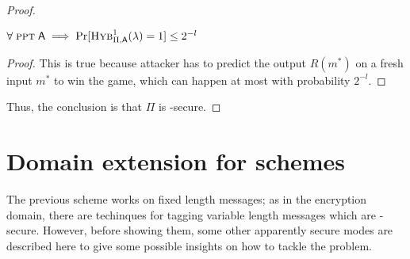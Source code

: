 \begin{proof}
\begin{cryptoredux}
        \cseqbeginloop
        \cseqendloop

        \cseqdelay
    

        \cseqdelay

        
    \end{cryptoredux}

    \begin{lemma}
        $\forall\; \ppt\; \adversary \implies \Pr[\hybridg{1}(\lambda) = 1] \leq 2^{-l}$
    \end{lemma}

    \begin{proof}
        This is true because attacker has to predict the output $R(m^*)$ on a fresh input $m^*$ to win the game, which can happen at most with probability $2^{-l}$.
    \end{proof}

    Thus, the conclusion is that $\Pi$ is \ufcma-secure.
\end{proof}

\pagebreak

\section{Domain extension for \mac{} schemes}

The previous scheme works on fixed length messages; as in the encryption domain, there are techinques for tagging variable length messages which are \ufcma-secure. However, before showing them, some other apparently secure modes are described here to give some possible insights on how to tackle the problem. 

